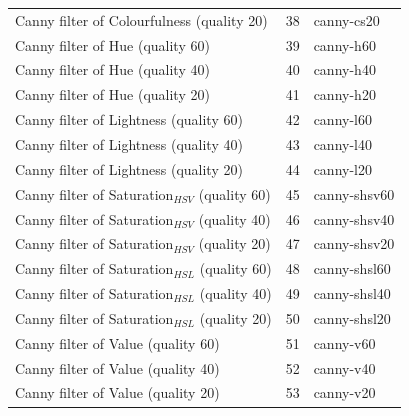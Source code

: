 \documentclass[11pt,a4paper,twoside,openright]{report}
\begin{document}
\begin{center}
\begin{longtable}{|l|c|l|}
Canny filter of Colourfulness (quality 20)      & 38 & canny-cs20      \\
Canny filter of Hue (quality 60)                & 39 & canny-h60       \\
Canny filter of Hue (quality 40)                & 40 & canny-h40       \\
Canny filter of Hue (quality 20)                & 41 & canny-h20       \\
Canny filter of Lightness (quality 60)          & 42 & canny-l60       \\
Canny filter of Lightness (quality 40)          & 43 & canny-l40       \\
Canny filter of Lightness (quality 20)          & 44 & canny-l20       \\
Canny filter of Saturation$_{HSV}$ (quality 60) & 45 & canny-shsv60    \\
Canny filter of Saturation$_{HSV}$ (quality 40) & 46 & canny-shsv40    \\
Canny filter of Saturation$_{HSV}$ (quality 20) & 47 & canny-shsv20    \\
Canny filter of Saturation$_{HSL}$ (quality 60) & 48 & canny-shsl60    \\
Canny filter of Saturation$_{HSL}$ (quality 40) & 49 & canny-shsl40    \\
Canny filter of Saturation$_{HSL}$ (quality 20) & 50 & canny-shsl20    \\
Canny filter of Value (quality 60)              & 51 & canny-v60       \\
Canny filter of Value (quality 40)              & 52 & canny-v40       \\
Canny filter of Value (quality 20)              & 53 & canny-v20       \\


\end{longtable}
\end{center}
\end{document}
